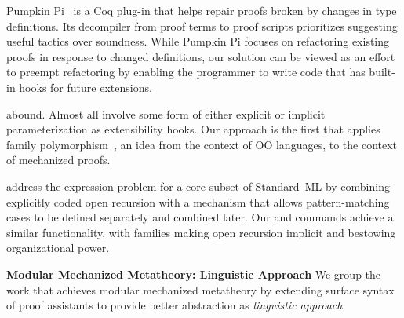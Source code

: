 Pumpkin Pi~\cite{ringer2021pumpkin} is a Coq plug-in that helps
repair proofs broken by changes in type definitions.
Its decompiler from proof terms to proof scripts prioritizes suggesting
useful tactics over soundness.
While Pumpkin Pi focuses on refactoring existing proofs in response to
changed definitions,
our solution can be viewed as an effort to preempt refactoring by
enabling the programmer to write code that has built-in hooks for
future extensions.

 \!abound.
Almost all involve some form of either explicit or implicit parameterization
as extensibility hooks.
Our approach is the first that applies family polymorphism~\cite{ernst2001family},
an idea from the context of OO languages,
to the context of mechanized proofs.

\citet{bac2006} address the expression problem for a core subset of Standard~ML
by combining explicitly coded open recursion with a mechanism that
allows pattern-matching cases to be defined separately and combined
later.
Our  and  commands achieve a similar
functionality, with families making open recursion implicit and
bestowing organizational power.




\ifShowOldWriting

\textbf{Modular Mechanized Metatheory: Linguistic Approach} We group the work that achieves modular mechanized metatheory by extending surface syntax of proof assistants to provide better abstraction as \textit{linguistic approach}. 

